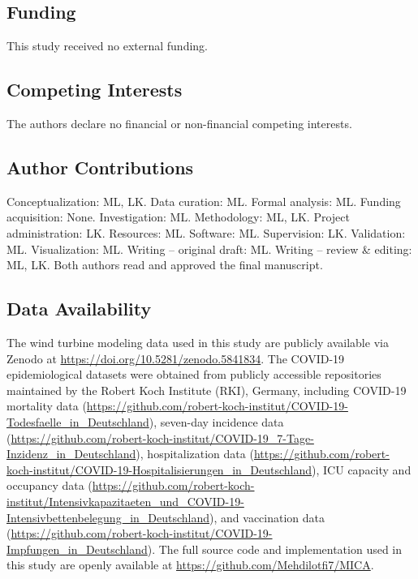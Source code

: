 \documentclass[10pt,letterpaper]{article}
\begin{document}
\subsection*{Funding}
This study received no external funding.

\subsection*{Competing Interests}
The authors declare no financial or non-financial competing interests.

\subsection*{Author Contributions}
Conceptualization: ML, LK.
Data curation: ML.
Formal analysis: ML.
Funding acquisition: None.
Investigation: ML.
Methodology: ML, LK.
Project administration: LK.
Resources: ML.
Software: ML.
Supervision: LK.
Validation: ML.
Visualization: ML.
Writing -- original draft: ML.
Writing -- review \& editing: ML, LK.
Both authors read and approved the final manuscript.


\subsection*{Data Availability}
The wind turbine modeling data used in this study are publicly available via Zenodo at
\url{https://doi.org/10.5281/zenodo.5841834}.
The COVID-19 epidemiological datasets were obtained from publicly accessible repositories maintained by the Robert Koch Institute (RKI), Germany, including COVID-19 mortality data
(\url{https://github.com/robert-koch-institut/COVID-19-Todesfaelle_in_Deutschland}),
seven-day incidence data
(\url{https://github.com/robert-koch-institut/COVID-19_7-Tage-Inzidenz_in_Deutschland}),
hospitalization data
(\url{https://github.com/robert-koch-institut/COVID-19-Hospitalisierungen_in_Deutschland}),
ICU capacity and occupancy data
(\url{https://github.com/robert-koch-institut/Intensivkapazitaeten_und_COVID-19-Intensivbettenbelegung_in_Deutschland}),
and vaccination data
(\url{https://github.com/robert-koch-institut/COVID-19-Impfungen_in_Deutschland}).
The full source code and implementation used in this study are openly available at
\url{https://github.com/Mehdilotfi7/MICA}.


%
%

\nocite{mochaWebsite,mochaGithub}

\end{document}
